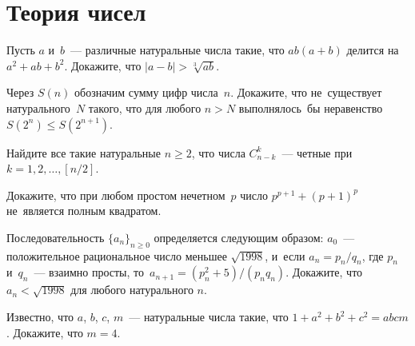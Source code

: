 
\section*{Теория чисел}


\begingroup
    \def\abs#1{\lvert #1 \rvert}

\begin{problems}

\item
Пусть $a$ и~$b$~--- различные натуральные числа такие, что $a b (a + b)$
делится на~$a^2 + a b + b^2$.
Докажите, что $\abs{a - b} > \sqrt[3]{ab}$.

\item
Через $S(n)$ обозначим сумму цифр числа~$n$.
Докажите, что не~существует натурального~$N$ такого, что для любого $n > N$
выполнялось~бы неравенство $S(2^n) \leq S(2^{n+1})$.

\item
Найдите все такие натуральные $n \geq 2$, что числа $C_{n-k}^k$~--- четные при
$k = 1, 2, \ldots, [n / 2]$. 

\item
Докажите, что при любом простом нечетном~$p$ число $p^{p+1} + (p + 1)^p$
не~является полным квадратом.


\item
Последовательность $\{a_n\}_{n \geq 0}$ определяется следующим образом:
$a_0$~--- положительное рациональное число меньшее $\sqrt{1998}$, и~если
$a_n = p_n / q_n$, где $p_n$ и~$q_n$~--- взаимно просты,
то~$a_{n+1} = (p_n^2 + 5) / (p_n q_n)$.
Докажите, что $a_n < \sqrt{1998}$ для любого натурального $n$.

\item
Известно, что $a$, $b$, $c$, $m$~--- натуральные числа такие, что
$1 + a^2 + b^2 + c^2 = a b c m$.
Докажите, что $m = 4$.


\end{problems}

\endgroup %

